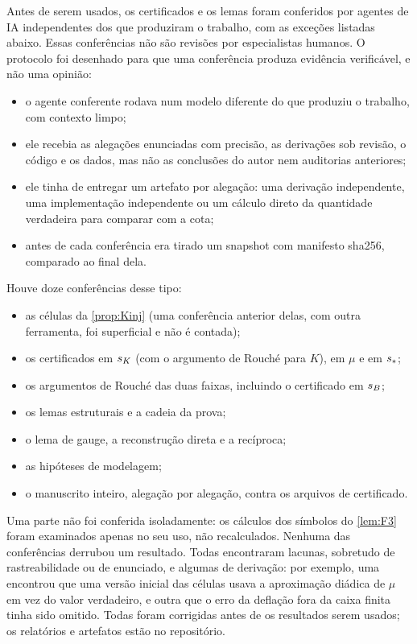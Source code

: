 Antes de serem usados, os certificados e os lemas foram conferidos por agentes de IA independentes dos que produziram o
trabalho, com as exceções listadas abaixo. Essas conferências não são revisões por especialistas humanos. O protocolo foi
desenhado para que uma conferência produza evidência verificável, e não uma opinião:
\begin{itemize}[leftmargin=*]
\item o agente conferente rodava num modelo diferente do que produziu o trabalho, com contexto limpo;
\item ele recebia as alegações enunciadas com precisão, as derivações sob revisão, o código e os dados, mas não
  as conclusões do autor nem auditorias anteriores;
\item ele tinha de entregar um artefato por alegação: uma derivação independente, uma implementação independente ou um
  cálculo direto da quantidade verdadeira para comparar com a cota;
\item antes de cada conferência era tirado um snapshot com manifesto sha256, comparado ao final dela.
\end{itemize}
Houve doze conferências desse tipo:
\begin{itemize}[leftmargin=*]
\item as células da \cref{prop:Kinj} (uma conferência anterior delas, com outra ferramenta, foi superficial e não é
  contada);
\item os certificados em $s_{K}$ (com o argumento de Rouch\'e para $K$), em $\mu$ e em $s_{\ast}$;
\item os argumentos de Rouch\'e das duas faixas, incluindo o certificado em $s_{B}$;
\item os lemas estruturais e a cadeia da prova;
\item o lema de gauge, a reconstrução direta e a recíproca;
\item as hipóteses de modelagem;
\item o manuscrito inteiro, alegação por alegação, contra os arquivos de certificado.
\end{itemize}
Uma parte não foi conferida isoladamente: os cálculos dos símbolos do \cref{lem:F3} foram examinados apenas no seu uso,
não recalculados. Nenhuma das conferências derrubou um resultado. Todas encontraram lacunas, sobretudo de rastreabilidade ou de enunciado,
e algumas de derivação: por exemplo, uma encontrou que uma versão inicial das células usava a aproximação diádica de
$\mu$ em vez do valor verdadeiro, e outra que o erro da deflação fora da caixa finita tinha sido omitido. Todas
foram corrigidas antes de os resultados serem usados; os relatórios e artefatos estão no repositório.

